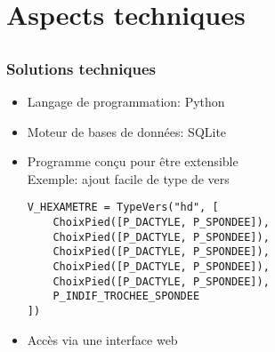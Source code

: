 \documentclass{beamer}
\begin{document}
\section{Aspects techniques}

\subsection*{}

\begin{frame}[fragile]
\frametitle{Solutions techniques}


\begin{itemize}
\item Langage de programmation: Python
\item Moteur de bases de données: SQLite

\vfill

\item Programme conçu pour être extensible\\
Exemple: ajout facile de type de vers

{
\footnotesize
\begin{verbatim}
V_HEXAMETRE = TypeVers("hd", [
    ChoixPied([P_DACTYLE, P_SPONDEE]),
    ChoixPied([P_DACTYLE, P_SPONDEE]),
    ChoixPied([P_DACTYLE, P_SPONDEE]),
    ChoixPied([P_DACTYLE, P_SPONDEE]),
    ChoixPied([P_DACTYLE, P_SPONDEE]),
    P_INDIF_TROCHEE_SPONDEE
])
\end{verbatim}
}

\vfill

\item Accès via une interface web

\end{itemize}
\end{frame} 
\end{document}
